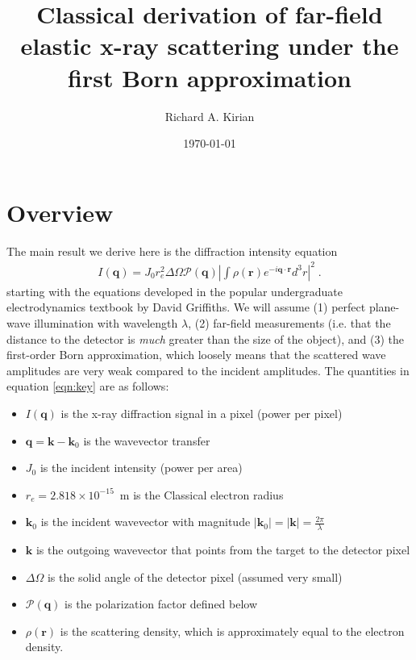 \documentclass[12pt]{article}
\title{Classical derivation of far-field elastic x-ray scattering under the first Born approximation}
\author{Richard A. Kirian}
\date{\today}
\renewcommand{\vec}[1]{\boldsymbol{#1}}
\newcommand{\abs}[1]{\left| #1 \right|}
\begin{document}
\maketitle

\section{Overview}
 
The main result we derive here is the diffraction intensity equation
\begin{align}\label{eqn:key}
    I(\vec{q}) = J_0 r_e^2 \Delta \Omega \mathcal{P}(\vec{q})  \abs{\int
\rho(\vec{r}) e^{-i \vec{q}\cdot\vec{r}} d^3 r }^2 \;.
\end{align}
starting with the equations developed in the popular undergraduate 
electrodynamics textbook by David Griffiths\cite{Griffiths2018}.
We will assume (1) perfect plane-wave illumination with wavelength 
$\lambda$, (2) far-field measurements (i.e. that the distance to the detector is
\emph{much} greater than the size of the object), and (3) the first-order Born 
approximation, which loosely means that the scattered wave amplitudes are very 
weak compared to the incident amplitudes. The quantities in equation 
\ref{eqn:key} are as follows:
\begin{itemize}
\item $I(\vec{q})$ is the x-ray diffraction signal in a pixel (power per 
pixel)
\item $\vec{q}=\vec{k}-\vec{k}_0$ is the wavevector transfer
\item $J_0$ is the incident intensity (power per area)
\item $r_e = 2.818 \times 10^{-15}$~m is the Classical electron radius
\item $\vec{k}_0$ is the incident wavevector with magnitude $|\vec{k}_0| = 
|\vec{k}| = \frac{2\pi}{\lambda}$
\item $\vec{k}$ is the outgoing wavevector that points from the target to the detector pixel
\item $\Delta \Omega$ is the solid angle of the detector pixel (assumed very 
small)
\item $\mathcal{P}(\vec{q})$ is the polarization factor defined below
\item $\rho(\vec{r})$ is the scattering density, which is approximately equal to 
the electron density.
\end{itemize}
\end{document}
